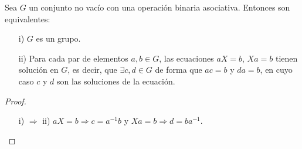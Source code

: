 \begin{lema}
    Sea $G$ un conjunto no vacío con una operación binaria asociativa. Entonces son equivalentes:
    \begin{enumerate}
        \item[i)] $G$ es un grupo.
        \item[ii)] Para cada par de elementos $a,b\in G$, las ecuaciones $aX=b$, $Xa=b$ tienen solución en $G$, es decir, que $\exists c,d\in G$ de forma que $ac=b$ y $da=b$, en cuyo caso $c$ y $d$ son las soluciones de la ecuación. 
    \end{enumerate}
    \begin{proof}\
        \begin{itemize}
            \item[i) $\Rightarrow$ ii)] $aX=b \Rightarrow c=a^{-1}b$ y $Xa=b\Rightarrow d=ba^{-1}$.
        \end{itemize}
    \end{proof}
\end{lema} 